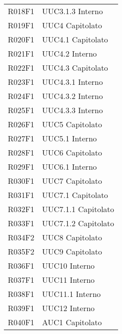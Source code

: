 \documentclass[../analisi-dei-requisiti.tex]{subfiles}
\begin{document}
\begin{longtable}[H]{ p{3cm} | p{4cm} }
  R018F1                               & UUC3.1.3 Interno              \\
  R019F1                               & UUC4 Capitolato               \\
  R020F1                               & UUC4.1 Capitolato             \\
  R021F1                               & UUC4.2 Interno                \\
  R022F1                               & UUC4.3 Capitolato             \\
  R023F1                               & UUC4.3.1 Interno              \\
  R024F1                               & UUC4.3.2 Interno              \\
  R025F1                               & UUC4.3.3 Interno              \\
  R026F1                               & UUC5 Capitolato               \\
  R027F1                               & UUC5.1 Interno                \\
  R028F1                               & UUC6 Capitolato               \\
  R029F1                               & UUC6.1 Interno                \\
  R030F1                               & UUC7 Capitolato               \\
  R031F1                               & UUC7.1 Capitolato             \\
  R032F1                               & UUC7.1.1 Capitolato           \\
  R033F1                               & UUC7.1.2 Capitolato           \\
  R034F2                               & UUC8 Capitolato               \\
  R035F2                               & UUC9 Capitolato               \\
  R036F1                               & UUC10 Interno                 \\
  R037F1                               & UUC11 Interno                 \\
  R038F1                               & UUC11.1 Interno               \\
  R039F1                               & UUC12 Interno                 \\
  R040F1                               & AUC1 Capitolato               \\

\end{longtable}
\end{document}
